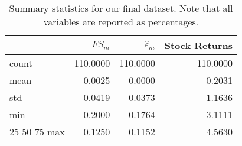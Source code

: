 \begin{table}
\centering
\caption{Summary statistics for our final dataset. Note that all variables are reported as percentages.}
\label{SumStats}
\begin{tabular}{lrrr}
\toprule
{} &  \(FS_m\) &  \(\hat{\epsilon}_m\) &  Stock Returns \\
\midrule
count &  110.0000 &              110.0000 &       110.0000 \\
mean  &   -0.0025 &                0.0000 &         0.2031 \\
std   &    0.0419 &                0.0373 &         1.1636 \\
min   &   -0.2000 &               -0.1764 &        -3.1111 \\
25%
50%
75%
max   &    0.1250 &                0.1152 &         4.5630 \\
\bottomrule
\end{tabular}
\end{table}
